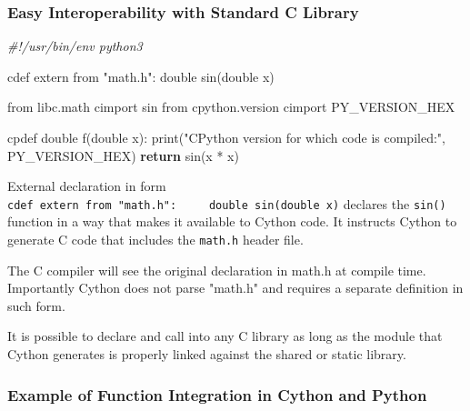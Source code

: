 \documentclass[
]{article}
\newenvironment{Shaded}{}{}
\newcommand{\BuiltInTok}[1]{#1}
\newcommand{\CommentTok}[1]{\textcolor[rgb]{0.38,0.63,0.69}{\textit{#1}}}
\newcommand{\ControlFlowTok}[1]{\textcolor[rgb]{0.00,0.44,0.13}{\textbf{#1}}}
\newcommand{\ImportTok}[1]{#1}
\newcommand{\NormalTok}[1]{#1}
\newcommand{\OperatorTok}[1]{\textcolor[rgb]{0.40,0.40,0.40}{#1}}
\newcommand{\StringTok}[1]{\textcolor[rgb]{0.25,0.44,0.63}{#1}}
\begin{document}
\hypertarget{easy-interoperability-with-standard-c-library}{%
\subsubsection{Easy Interoperability with Standard C
Library}\label{easy-interoperability-with-standard-c-library}}

\begin{Shaded}
\begin{Highlighting}[]
\CommentTok{\#!/usr/bin/env python3}

\NormalTok{cdef extern }\ImportTok{from} \StringTok{"math.h"}\NormalTok{:     }
\NormalTok{    double sin(double x)}

\ImportTok{from}\NormalTok{ libc.math cimport sin}
\ImportTok{from}\NormalTok{ cpython.version cimport PY\_VERSION\_HEX}

\NormalTok{cpdef double f(double x):     }
  \BuiltInTok{print}\NormalTok{(}\StringTok{"CPython version for which code is compiled:"}\NormalTok{, }
\NormalTok{        PY\_VERSION\_HEX)}
  \ControlFlowTok{return}\NormalTok{ sin(x }\OperatorTok{*}\NormalTok{ x)}
\end{Highlighting}
\end{Shaded}

External declaration in form
\texttt{cdef\ extern\ from\ "math.h":\ \ \ \ \ double\ sin(double\ x)}
declares the \texttt{sin()} function in a way that makes it available to
Cython code. It instructs Cython to generate C code that includes the
\texttt{math.h} header file.

The C compiler will see the original declaration in math.h at compile
time. Importantly Cython does not parse "math.h" and requires a separate
definition in such form.

It is possible to declare and call into any C library as long as the
module that Cython generates is properly linked against the shared or
static library.

\hypertarget{example-of-function-integration-in-cython-and-python}{%
\subsubsection{Example of Function Integration in Cython and
Python}\label{example-of-function-integration-in-cython-and-python}}
\end{document}
